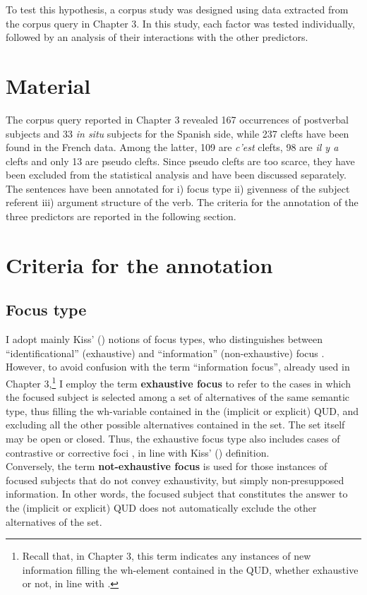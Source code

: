 To test this hypothesis, a corpus study was designed using data extracted from the corpus query in Chapter 3. In this study, each factor was tested individually, followed by an analysis of their interactions with the other predictors.
\section{Material}
The corpus query reported in Chapter 3 revealed 167 occurrences of postverbal subjects and 33 \textit{in situ} subjects for the Spanish side, while 237 clefts have been found in the French data. Among the latter, 109 are \textit{c'est} clefts, 98 are \textit{il y a} clefts and only 13 are pseudo clefts. Since pseudo clefts are too scarce, they have been excluded from the statistical analysis and have been discussed separately. The sentences have been annotated for i) focus type ii) givenness of the subject referent iii) argument structure of the verb. The criteria for the annotation of the three predictors are reported in the following section.

\section{Criteria for the annotation}
\subsection{Focus type}
I adopt mainly Kiss' (\citeyear{kiss1998identificational}) notions of focus types, who distinguishes between ``identificational” (exhaustive) and ``information” (non-exhaustive) focus \parencite{kiss1998identificational}. However, to avoid confusion with the term ``information focus”, already used in Chapter 3,\footnote{Recall that, in Chapter 3, this term indicates any instances of new information filling the wh-element contained in the QUD, whether exhaustive or not, in line with \textcite{krifka2008basic}.} I employ the term \textbf{exhaustive focus} to refer to the cases in which the focused subject is selected among a set of alternatives of the same semantic type, thus filling the wh-variable contained in the (implicit or explicit) QUD, and excluding all the other possible alternatives contained in the set. The set itself may be open or closed. Thus, the exhaustive focus type also includes cases of contrastive or corrective foci \parencite{van2004incompatibility, steube2001correction,REPP20101333}, in line with Kiss' (\citeyear{kiss1998identificational}) definition. \\
Conversely, the term \textbf{not-exhaustive focus} is used for those instances of focused subjects that do not convey exhaustivity, but simply non-presupposed information. In other words, the focused subject that constitutes the answer to the (implicit or explicit) QUD does not automatically exclude the other alternatives of the set.
\\

